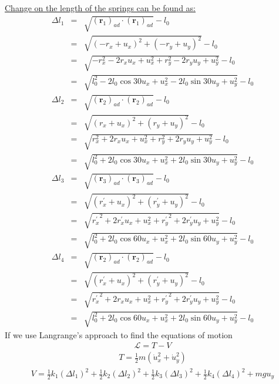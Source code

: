 \documentclass[]{report}
\begin{document}
\underline{Change on the length of the springs can be found as:}
\begin{eqnarray*}
\Delta l_1 &=&\sqrt{\left(\mathbf{r}_1\right)_{ad}\cdot\left(\mathbf{r}_1\right)_{ad}} -l_0\\
&=&\sqrt{\left(-r_x+u_x\right)^2+\left(-r_y+u_y\right)^2}-l_0\\
&=&\sqrt{-r_x^2-2r_x u_x+u_x^2+r_y^2-2r_y u_y+u_y^2}-l_0\\
&=&\sqrt{l_0^2-2l_0 \cos{30} u_x+u_x^2-2 l_0 \sin{30} u_y+u_y^2}-l_0
\end{eqnarray*}
\begin{eqnarray*}
\Delta l_2 &=&\sqrt{\left(\mathbf{r}_2\right)_{ad}\cdot\left(\mathbf{r}_2\right)_{ad}} -l_0\\
&=&\sqrt{\left(r_x+u_x\right)^2+\left(r_y+u_y\right)^2}-l_0\\
&=&\sqrt{r_x^2+2r_x u_x+u_x^2+r_y^2+2r_y u_y+u_y^2}-l_0\\
&=&\sqrt{l_0^2+2l_0 \cos{30} u_x+u_x^2+2 l_0 \sin{30} u_y+u_y^2}-l_0
\end{eqnarray*}
\begin{eqnarray*}
\Delta l_3 &=&\sqrt{\left(\mathbf{r}_3\right)_{ad}\cdot\left(\mathbf{r}_3\right)_{ad}} -l_0\\
&=&\sqrt{\left(r^{'}_x+u_x\right)^2+\left(r^{'}_y+u_y\right)^2}-l_0\\
&=&\sqrt{ {r^{'}_x}^2+2r^{'}_x u_x+u_x^2+{r^{'}_y}^2+2 r^{'}_y u_y+u_y^2}-l_0\\
&=&\sqrt{l_0^2+2l_0 \cos{60} u_x+u_x^2+2 l_0 \sin{60} u_y+u_y^2}-l_0
\end{eqnarray*}
\begin{eqnarray*}
\Delta l_4 &=&\sqrt{\left(\mathbf{r}_2\right)_{ad}\cdot\left(\mathbf{r}_2\right)_{ad}} -l_0\\
&=&\sqrt{\left(r^{'}_x+u_x\right)^2+\left(r^{'}_y+u_y\right)^2}-l_0\\
&=&\sqrt{{r^{'}_x}^2+2r_x u_x+u_x^2+{r^{'}_y}^2+2r^{'}_y u_y+u_y^2}-l_0\\
&=&\sqrt{l_0^2+2l_0 \cos{60} u_x+u_x^2+2 l_0 \sin{60} u_y+u_y^2}-l_0
\end{eqnarray*}
If we use Langrange's approach to find the equations of motion
\begin{eqnarray*}
\mathcal{L}=T-V
\end{eqnarray*}
\begin{eqnarray*}
T=\frac{1}{2}m\left(\dot{u}_x^2+\dot{u}_y^2\right)
\end{eqnarray*}
\begin{eqnarray*}
V=\frac{1}{2} k_1 \left({\Delta l_1}\right)^2+\frac{1}{2} k_2 \left({\Delta l_2}\right)^2+\frac{1}{2} k_3 \left({\Delta l_3}\right)^2+\frac{1}{2} k_4 \left({\Delta l_4}\right)^2+mg u_y
\end{eqnarray*}
\end{document}
